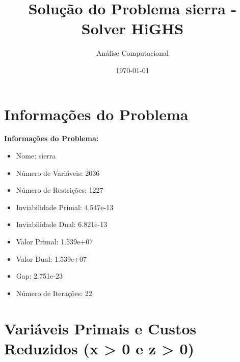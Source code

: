 \documentclass[12pt]{article}
\title{Solução do Problema sierra - Solver HiGHS}
\author{Análise Computacional}
\date{\today}
\begin{document}
\maketitle

\section{Informações do Problema}

\textbf{Informações do Problema:}
\begin{itemize}
\item Nome: sierra
\item Número de Variáveis: 2036
\item Número de Restrições: 1227
\item Inviabilidade Primal: 4.547e-13
\item Inviabilidade Dual: 6.821e-13
\item Valor Primal: 1.539e+07
\item Valor Dual: 1.539e+07
\item Gap: 2.751e-23
\item Número de Iterações: 22
\end{itemize}


\section{Variáveis Primais e Custos Reduzidos (x > 0 e z > 0)}
\end{document}
